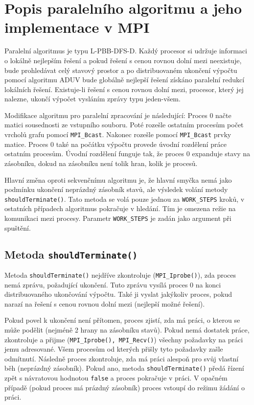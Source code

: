 \documentclass[12pt]{article}
\begin{document}
\section{Popis paralelního algoritmu a jeho implementace v MPI}

Paralelní algoritmus je typu L-PBB-DFS-D. Každý procesor si udržuje informaci o lokálně nejlepším řešení a pokud řešení s cenou rovnou dolní mezi neexistuje, bude prohledávat celý stavový prostor a po distribuovaném ukončení výpočtu pomocí algoritmu ADUV bude globálně nejlepší řešení získáno paralelní redukcí lokálních řešení. Existuje-li řešení s cenou rovnou dolní mezi, procesor, který jej nalezne, ukončí výpočet vysláním zprávy typu jeden-všem.

Modifikace algoritmu pro paralelní zpracování je následující: Proces 0 načte matici sousednosti ze vstupního souboru. Poté rozešle ostatním procesům počet vrcholů grafu pomocí \texttt{MPI\_Bcast}. Nakonec rozešle pomocí \texttt{MPI\_Bcast} prvky matice. Proces 0 také na počátku výpočtu provede úvodní rozdělení práce ostatním procesům. Úvodní rozdělení funguje tak, že proces 0 expanduje stavy na zásobníku, dokud na zásobníku není tolik hran, kolik je procesů.

Hlavní změna oproti sekvenčnímu algoritmu je, že hlavní smyčka nemá jako podmínku ukončení neprázdný zásobník stavů, ale výsledek volání metody \texttt{shouldTerminate()}. Tato metoda se volá pouze jednou za \texttt{WORK\_STEPS} kroků, v ostatních případech algoritmus pokračuje v hledání. Tím je omezena režie na komunikaci mezi procesy. Parametr \texttt{WORK\_STEPS} je zadán jako argument při spuštění.

\subsection{Metoda \texttt{shouldTerminate()}}

Metoda \texttt{shouldTerminate()} nejdříve zkontroluje (\texttt{MPI\_Iprobe()}), zda proces nemá zprávu, požadující ukončení. Tuto zprávu vysílá proces 0 na konci distribuovaného ukončování výpočtu. Také ji vyslat jakýkoliv proces, pokud narazí na řešení s cenou rovnou dolní mezi (nejlepší možné řešení). 

Pokud povel k ukončení není přítomen, proces zjistí, zda má práci, o kterou se může podělit (nejméně 2 hrany na zásobníku stavů). Pokud nemá dostatek práce, zkontroluje a přijme (\texttt{MPI\_Iprobe(), MPI\_Recv()}) všechny požadavky na práci jemu adresované. Všem procesům od kterých přišly tyto požadavky zašle odmítnutí. Následně proces zkontroluje, zda má práci alespoň pro svůj vlastní běh (neprázdný zásobník). Pokud ano, metoda \texttt{shouldTerminate()} předá řízení zpět s návratovou hodnotou \texttt{false} a proces pokračuje v práci. V opačném případě (pokud proces má prázdný zásobník) proces vstoupí do režimu žádání o práci.
 
\end{document}
